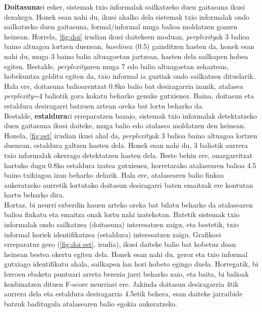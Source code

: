 \documentclass[information,article,submit,moreauthors,pdftex,10pt,a4paper]{Definitions/mdpi}
\begin{document}
\textbf{Doitasuna}ri esker, sistemak txio informalak sailkatzeko duen gaitasuna ikusi dezakegu. Honek esan nahi du, ikusi ahalko dela sistemak txio informalak ondo sailkatzeko duen gaitasuna, formal/informal muga balioa moldatzen goazen heinean. Horrela, \ref{fig:doi} irudian ikusi daitekeen moduan, \textit{perplexity}ak 3 balioa baino altuagoa lortzen duenean, \textit{baseline}a (0.5) gainditzen hasten da, honek esan nahi du, muga 3 baino balio altuagoetan jartzean, hasten dela sailkapen hobea egiten. Bestalde, \textit{perplexity}aren muga 7 edo balio altuagoetan zehaztean, hobekuntza gelditu egiten da, txio informal ia guztiak ondo sailkatzen dituelarik. Hala ere, doitasuna balioarentzat 0.8ko balio bat desiragarria izanik, atalasea \textit{perplexity}=4 baliotik gora kokatu beharko genuke gutxienez. Baina, doitasun eta estaldura desiragarri batzuen artean oreka bat lortu beharko da.\\
\indent Bestalde, \textbf{estaldura}ri erreparatzen bazaio, sistemak txio informalak detektatzeko duen gaitasuna ikusi daiteke, muga balio edo atalasea moldatzen den heinean. Honela, \ref{fig:est} irudian ikusi ahal da, \textit{perplexity}ak 3 balioa baino altuagoa lortzen duenean, estaldura galtzen hasten dela. Honek esan nahi du, 3 baliotik aurrera txio informalak okerrago detektatzen hasten dela. Beste behin ere, onargarritzat hartuko dugu 0.8ko estaldura izatea gutxienez, horretarako atalasearen balioa 4.5 baino txikiagoa izan beharko delarik. Hala ere, atalasearen balio finkoa aukeratzeko aurretik lortutako doitasun desiragarri baten emaitzak ere kontutan hartu beharko dira.\\
\indent Hortaz, bi neurri ezberdin hauen arteko oreka bat bilatu beharko da atalasearen balioa finkatu eta emaitza onak lortu nahi izatekotan. Batetik sistemak txio informalak ondo sailkatzea (doitasuna) interesatzen zaigu, eta bestetik, txio informal horiek identifikatzea (estaldura) interesatzen zaigu. Grafikoei erreparatuz gero (\ref{fig:doi est}. irudia), ikusi daiteke balio bat hobetuz doan heinean bestea okertu egiten dela. Honek esan nahi du, geroz eta txio informal gutxiago identifikatu ahala, sailkapen lan hori hobeto egingo duela. Horregatik, bi lerroen ebaketa puntuari arreta berezia jarri beharko zaio, eta baita, bi balioak konbinatzen dituen F-score neurriari ere. Jakinda doitasun desiragarria 4tik aurrera dela eta estaldura desiragarria 4.5etik behera, esan daiteke jarraibide batzuk baditugula atalasearen balio egokia aukeratzeko.
\end{document}
